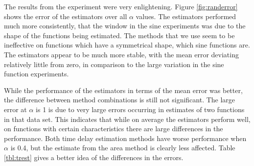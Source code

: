 \documentclass[a4paper,11pt]{article}
\begin{document}
    The results from the experiment were very enlightening. Figure
    \ref{fig:randerror} shows the error of the estimators over all $\alpha$
    values. The estimators performed much more consistently, that the window in
    the sine experiments was due to the shape of the functions being
    estimated. The methods that we use seem to be ineffective on functions which
    have a symmetrical shape, which sine functions are. The estimators appear to
    be much more stable, with the mean error deviating relatively little from
    zero, in comparison to the large variation in the sine function experiments.

    While the performance of the estimators in terms of the mean error was
    better, the difference between method combinations is still not
    significant. The large error at $\alpha$ is 1 is due to very large errors
    occurring in estimates of two functions in that data set. This indicates
    that while on average the estimators perform well, on functions with certain
    characteristics there are large differences in the performance. Both time
    delay estimation methods have worse performance when $\alpha$ is 0.4, but
    the estimate from the area method is clearly less affected. Table
    \ref{tbl:trest} gives a better idea of the differences in the errors.
\end{document}
